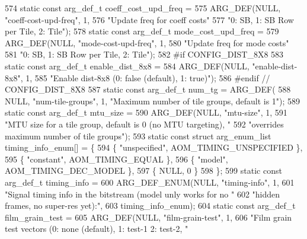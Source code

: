 \begin{DoxyCodeInclude}
{{{{{{{574 \textcolor{keyword}{static} \textcolor{keyword}{const} arg\_def\_t coeff\_cost\_upd\_freq =
575     ARG\_DEF(NULL, \textcolor{stringliteral}{"coeff-cost-upd-freq"}, 1,
576             \textcolor{stringliteral}{"Update freq for coeff costs"}
577             \textcolor{stringliteral}{"0: SB, 1: SB Row per Tile, 2: Tile"});
578 \textcolor{keyword}{static} \textcolor{keyword}{const} arg\_def\_t mode\_cost\_upd\_freq =
579     ARG\_DEF(NULL, \textcolor{stringliteral}{"mode-cost-upd-freq"}, 1,
580             \textcolor{stringliteral}{"Update freq for mode costs"}
581             \textcolor{stringliteral}{"0: SB, 1: SB Row per Tile, 2: Tile"});
582 \textcolor{preprocessor}{#if CONFIG\_DIST\_8X8}
583 \textcolor{keyword}{static} \textcolor{keyword}{const} arg\_def\_t enable\_dist\_8x8 =
584     ARG\_DEF(NULL, \textcolor{stringliteral}{"enable-dist-8x8"}, 1,
585             \textcolor{stringliteral}{"Enable dist-8x8 (0: false (default), 1: true)"});
586 \textcolor{preprocessor}{#endif  // CONFIG\_DIST\_8X8}
587 \textcolor{keyword}{static} \textcolor{keyword}{const} arg\_def\_t num\_tg = ARG\_DEF(
588     NULL, \textcolor{stringliteral}{"num-tile-groups"}, 1, \textcolor{stringliteral}{"Maximum number of tile groups, default is 1"});
589 \textcolor{keyword}{static} \textcolor{keyword}{const} arg\_def\_t mtu\_size =
590     ARG\_DEF(NULL, \textcolor{stringliteral}{"mtu-size"}, 1,
591             \textcolor{stringliteral}{"MTU size for a tile group, default is 0 (no MTU targeting), "}
592             \textcolor{stringliteral}{"overrides maximum number of tile groups"});
593 \textcolor{keyword}{static} \textcolor{keyword}{const} \textcolor{keyword}{struct }arg\_enum\_list timing\_info\_enum[] = \{
594   \{ \textcolor{stringliteral}{"unspecified"}, AOM\_TIMING\_UNSPECIFIED \},
595   \{ \textcolor{stringliteral}{"constant"}, AOM\_TIMING\_EQUAL \},
596   \{ \textcolor{stringliteral}{"model"}, AOM\_TIMING\_DEC\_MODEL \},
597   \{ NULL, 0 \}
598 \};
599 \textcolor{keyword}{static} \textcolor{keyword}{const} arg\_def\_t timing\_info =
600     ARG\_DEF\_ENUM(NULL, \textcolor{stringliteral}{"timing-info"}, 1,
601                  \textcolor{stringliteral}{"Signal timing info in the bitstream (model unly works for no "}
602                  \textcolor{stringliteral}{"hidden frames, no super-res yet):"},
603                  timing\_info\_enum);
604 \textcolor{keyword}{static} \textcolor{keyword}{const} arg\_def\_t film\_grain\_test =
605     ARG\_DEF(NULL, \textcolor{stringliteral}{"film-grain-test"}, 1,
606             \textcolor{stringliteral}{"Film grain test vectors (0: none (default), 1: test-1  2: test-2, "}
}}}}}}}
\end{DoxyCodeInclude}
